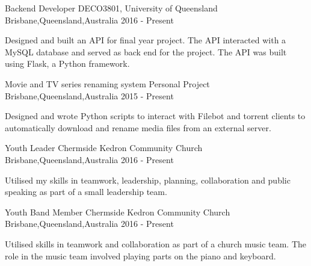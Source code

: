 


\begin{cventries}
\cventry
{Backend Developer} %
{DECO3801, University of Queensland} %
{Brisbane,Queensland,Australia} %
{2016 - Present} %
{ %
	\begin{cvitems}
		\item {Designed and built an API for final year project. The API interacted with a MySQL database and served as back end for the project. The API was built using Flask, a Python framework.}
	\end{cvitems}
}

\cventry
{Movie and TV series renaming system} %
{Personal Project} %
{Brisbane,Queensland,Australia} %
{2015 - Present} %
{ %
	\begin{cvitems}
		\item {Designed and wrote Python scripts to interact with Filebot and torrent clients to automatically download and rename media files from an external server.}
	\end{cvitems}
}


\cventry
{Youth Leader} %
{Chermside Kedron Community Church} %
{Brisbane,Queensland,Australia} %
{2016 - Present} %
{ %
\begin{cvitems}
\item {Utilised my skills in teamwork, leadership, planning, collaboration and public speaking as part of a small leadership team.}
\end{cvitems}
}


\cventry
{Youth Band Member} %
{Chermside Kedron Community Church} %
{Brisbane,Queensland,Australia} %
{2016 - Present} %
{ %
\begin{cvitems}
	\item {Utilised skills in teamwork and collaboration as part of a church music team. The role in the music team involved playing parts on the piano and keyboard.}
\end{cvitems}
}


\end{cventries}

